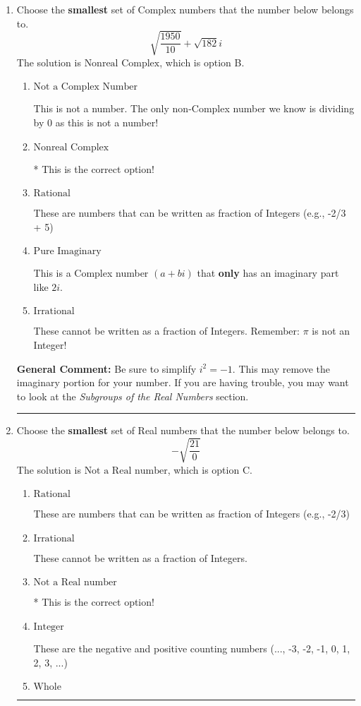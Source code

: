 \documentclass{extbook}[14pt]
\newcommand{\litem}[1]{\item #1

\rule{\textwidth}{0.4pt}}
\begin{document}
\begin{enumerate}\litem{
Choose the \textbf{smallest} set of Complex numbers that the number below belongs to.
\[ \sqrt{\frac{1950}{10}}+\sqrt{182} i \]The solution is \( \text{Nonreal Complex} \), which is option B.\begin{enumerate}[label=\Alph*.]
\item \( \text{Not a Complex Number} \)

This is not a number. The only non-Complex number we know is dividing by 0 as this is not a number!
\item \( \text{Nonreal Complex} \)

* This is the correct option!
\item \( \text{Rational} \)

These are numbers that can be written as fraction of Integers (e.g., -2/3 + 5)
\item \( \text{Pure Imaginary} \)

This is a Complex number $(a+bi)$ that \textbf{only} has an imaginary part like $2i$.
\item \( \text{Irrational} \)

These cannot be written as a fraction of Integers. Remember: $\pi$ is not an Integer!
\end{enumerate}

\textbf{General Comment:} Be sure to simplify $i^2 = -1$. This may remove the imaginary portion for your number. If you are having trouble, you may want to look at the \textit{Subgroups of the Real Numbers} section.
}
\litem{
Choose the \textbf{smallest} set of Real numbers that the number below belongs to.
\[ -\sqrt{\frac{21}{0}} \]The solution is \( \text{Not a Real number} \), which is option C.\begin{enumerate}[label=\Alph*.]
\item \( \text{Rational} \)

These are numbers that can be written as fraction of Integers (e.g., -2/3)
\item \( \text{Irrational} \)

These cannot be written as a fraction of Integers.
\item \( \text{Not a Real number} \)

* This is the correct option!
\item \( \text{Integer} \)

These are the negative and positive counting numbers (..., -3, -2, -1, 0, 1, 2, 3, ...)
\item \( \text{Whole} \)


\end{enumerate}}
\end{enumerate}
\end{document}
